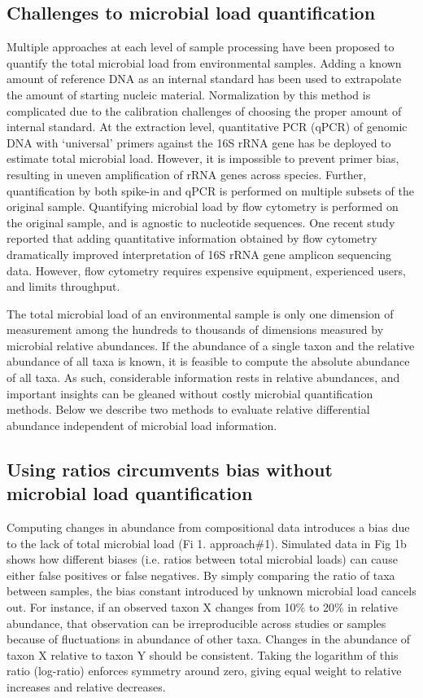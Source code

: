 \subsection{Challenges to microbial load quantification}

Multiple approaches at each level of sample processing have been proposed to quantify the total microbial load from environmental samples. Adding a known amount of reference DNA as an internal standard has been used to extrapolate the amount of starting nucleic material\cite{Smets2015-od, Tkacz2018-fp}. Normalization by this method is complicated due to the calibration challenges of choosing the proper amount of internal standard\cite{Tkacz2018-fp,Smets2015-od}. At the extraction level, quantitative PCR (qPCR) of genomic DNA with ‘universal’ primers against the 16S rRNA gene has be deployed to estimate total microbial load\cite{Nadkarni2002-og}. However, it is impossible to prevent primer bias, resulting in uneven amplification of rRNA genes across species. Further, quantification by both spike-in and qPCR is performed on multiple subsets of the original sample.  Quantifying microbial load by flow cytometry is performed on the original sample, and is agnostic to nucleotide sequences. One recent study reported that adding quantitative information obtained by flow cytometry dramatically improved interpretation of 16S rRNA gene amplicon sequencing data\cite{Vandeputte2017-jl}. However, flow cytometry requires expensive equipment, experienced users, and limits throughput.

The total microbial load of an environmental sample is only one dimension of measurement among the hundreds to thousands of dimensions measured by microbial relative abundances. If the abundance of a single taxon and the relative abundance of all taxa is known, it is feasible to compute the absolute abundance of all taxa. As such, considerable information rests in relative abundances, and important insights can be gleaned without costly microbial quantification methods. Below we describe two methods to evaluate relative differential abundance independent of microbial load information.

\subsection{Using ratios circumvents bias without microbial load quantification}
Computing changes in abundance from compositional data introduces a bias due to the lack of total microbial load (Fi 1. approach\#1). Simulated data in Fig 1b shows how different biases (i.e. ratios between total microbial loads) can cause either false positives or false negatives.
By simply comparing the ratio of taxa between samples, the bias constant introduced by unknown microbial load cancels out. For instance, if an observed taxon X changes from 10\% to 20\% in relative abundance, that observation can be irreproducible across studies or samples because of fluctuations in abundance of other taxa. Changes in the abundance of taxon X relative to taxon Y should be consistent. Taking the logarithm of this ratio (log-ratio) enforces symmetry around zero, giving equal weight to relative increases and relative decreases.

